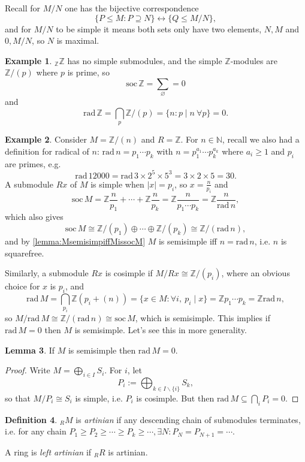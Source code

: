 \documentclass[a4paper]{article}
\newcommand{\N}{\mathbb{N}}
\newcommand{\Z}{\mathbb{Z}}
\newcommand{\rad}{\text{rad}\,}
\newcommand{\soc}{\text{soc}\,}
\theoremstyle{definition}
\newtheorem{defn}{Definition}[subsection]
\newtheorem{lemma}[defn]{Lemma}
\newtheorem{example}[defn]{Example}
\begin{document}
Recall for $M/N$ one has the bijective correspondence
\[
\{P\leq M:P\supseteq N\} \leftrightarrow \{Q\leq M/N\},
\]
and for $M/N$ to be simple it means both sets only have two elements, $N,M$ and $0,M/N$, so $N$ is maximal.

\begin{example}
$_\Z \Z$ has no simple submodules, and the simple $\Z$-modules are $\Z/(p)$ where $p$ is prime, so
\[
\soc\Z=\sum_\varnothing=0
\]
and
\[
\rad\Z=\bigcap_{p}\Z/(p)=\{n:p\mid n \ \forall p\}=0.
\]
\end{example}

\begin{example}
Consider $M=\Z/(n)$ and $R=\Z$. For $n\in\N$, recall we also had a definition for radical of $n$: $\rad n=p_1\cdots p_k$ with $n=p_1^{a_1}\cdots p_k^{a_k}$ where $a_i\geq 1$ and $p_i$ are primes, e.g.
\[
\rad 12000=\rad 3\times 2^5\times 5^3=3\times 2\times 5=30.
\]
A submodule $Rx$ of $M$ is simple when $|x|=p_i$, so $x=\frac{n}{p_i}$ and
\[
\soc M=\Z \frac{n}{p_1}+\cdots+\Z \frac{n}{p_k}=\Z\frac{n}{p_1\cdots p_k}=\Z\frac{n}{\rad n},
\]
which also gives
\[
\soc M\cong \Z/(p_1)\oplus\cdots\oplus\Z/(p_k)\cong\Z/(\rad n),
\]
and by \ref{lemma:MsemisimpiffMissocM} $M$ is semisimple iff $n=\rad n$, i.e. $n$ is squarefree.

Similarly, a submodule $Rx$ is cosimple if $M/Rx\cong \Z/(p_i)$, where an obvious choice for $x$ is $p_i$, and
\[
\rad M=\bigcap_{p_i}\Z(p_i+(n))=\{x\in M:\forall i,\ p_i\mid x\}=\Z p_1\cdots p_k=\Z\rad n,
\]
so $M/\rad M\cong \Z/(\rad n)\cong\soc M$, which is semisimple. This implies if $\rad M=0$ then $M$ is semisimple. Let's see this in more generality.
\end{example}

\begin{lemma}
\label{lemma:MsemisimpthenradMis0}
If $M$ is semisimple then $\rad M=0$.
\end{lemma}
\begin{proof}
Write $M=\bigoplus_{i\in I}S_i$. For $i$, let
\[
P_i:=\bigoplus_{k\in I\backslash\{i\}}S_k,
\]
so that $M/P_i\cong S_i$ is simple, i.e. $P_i$ is cosimple. But then $\rad M\subseteq \bigcap_i P_i=0$.
\end{proof}

\begin{defn}
$_RM$ is \textit{artinian} if any descending chain of submodules terminates, i.e. for any chain $P_1\geq P_2\geq\cdots\geq P_k\geq\cdots, \exists N:P_N=P_{N+1}=\cdots$.

A ring is \textit{left artinian} if $_RR$ is artinian.
\end{defn}
\end{document}
